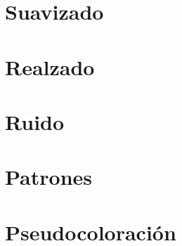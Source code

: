 \documentclass[12pt]{article}
\begin{document}
	\section{Suavizado}
	
	\section{Realzado}
	
	\section{Ruido}
	
	\section{Patrones}
	
	\section{Pseudocoloración}
\end{document}
